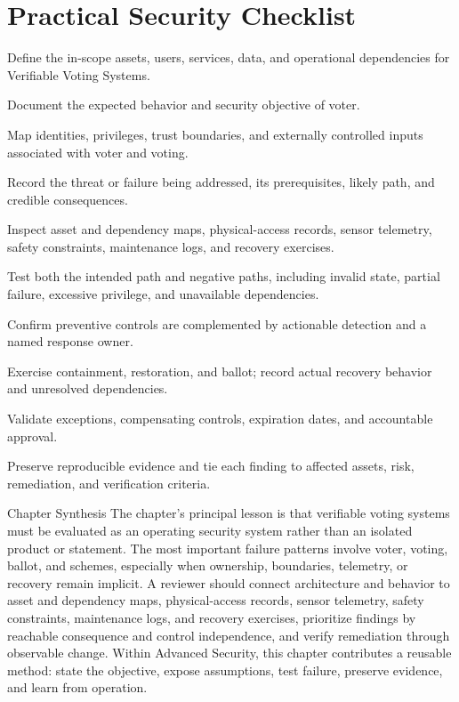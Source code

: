 \documentclass[11pt,letterpaper]{article}
\begin{document}
\section*{Practical Security Checklist}
\begin{CornellChecklist}
\item Define the in-scope assets, users, services, data, and operational dependencies for Verifiable Voting Systems.
\item Document the expected behavior and security objective of voter.
\item Map identities, privileges, trust boundaries, and externally controlled inputs associated with voter and voting.
\item Record the threat or failure being addressed, its prerequisites, likely path, and credible consequences.
\item Inspect asset and dependency maps, physical-access records, sensor telemetry, safety constraints, maintenance logs, and recovery exercises.
\item Test both the intended path and negative paths, including invalid state, partial failure, excessive privilege, and unavailable dependencies.
\item Confirm preventive controls are complemented by actionable detection and a named response owner.
\item Exercise containment, restoration, and ballot; record actual recovery behavior and unresolved dependencies.
\item Validate exceptions, compensating controls, expiration dates, and accountable approval.
\item Preserve reproducible evidence and tie each finding to affected assets, risk, remediation, and verification criteria.
\end{CornellChecklist}
\begin{CornellSummaryBox}{Chapter Synthesis}
The chapter's principal lesson is that verifiable voting systems must be evaluated as an operating security system rather than an isolated product or statement. The most important failure patterns involve voter, voting, ballot, and schemes, especially when ownership, boundaries, telemetry, or recovery remain implicit. A reviewer should connect architecture and behavior to asset and dependency maps, physical-access records, sensor telemetry, safety constraints, maintenance logs, and recovery exercises, prioritize findings by reachable consequence and control independence, and verify remediation through observable change. Within Advanced Security, this chapter contributes a reusable method: state the objective, expose assumptions, test failure, preserve evidence, and learn from operation.
\end{CornellSummaryBox}
\end{document}
